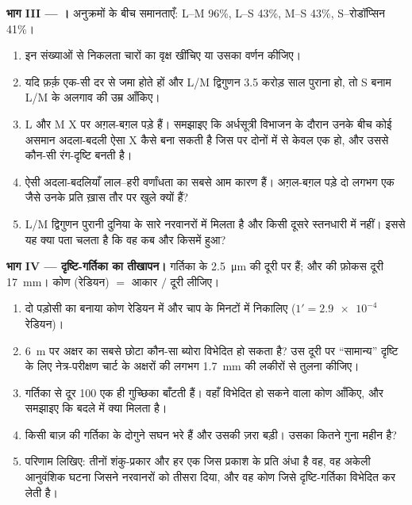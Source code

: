 \begin{problem}
\medskip
\noindent\textbf{भाग III --- ।}
  अनुक्रमों के बीच समानताएँ: L--M 96\%, L--S 43\%, M--S
43\%, S--रोडॉप्सिन 41\%।
\begin{enumerate}[resume]
  \item इन संख्याओं से निकलता चारों  का वृक्ष खींचिए या उसका वर्णन
        कीजिए।
  \item यदि फ़र्क़ एक-सी दर से जमा होते हों और L/M द्विगुणन 3.5 करोड़ साल
        पुराना हो, तो S बनाम L/M के अलगाव की उम्र आँकिए।
  \item L और M  X पर अग़ल-बग़ल पड़े हैं। समझाइए कि अर्धसूत्री विभाजन के
        दौरान उनके बीच कोई असमान अदला-बदली ऐसा X कैसे बना सकती है जिस पर
        दोनों में से केवल एक हो, और उससे कौन-सी रंग-दृष्टि बनती है।
  \item ऐसी अदला-बदलियाँ लाल--हरी वर्णांधता का सबसे आम कारण हैं। अग़ल-बग़ल
        पड़े दो लगभग एक जैसे  उनके प्रति ख़ास तौर पर खुले क्यों हैं?
  \item L/M द्विगुणन पुरानी दुनिया के सारे नरवानरों में मिलता है और किसी
        दूसरे स्तनधारी में नहीं। इससे यह क्या पता चलता है कि वह कब और
        किसमें हुआ?
\end{enumerate}

\medskip
\noindent\textbf{भाग IV --- दृष्टि-गर्तिका का तीखापन।}
गर्तिका के  \qty{2.5}{\micro m} की दूरी पर हैं; और  की फ़ोकस दूरी
\qty{17}{mm}। कोण (रेडियन) $=$ आकार $/$ दूरी लीजिए।
\begin{enumerate}[resume]
  \item दो पड़ोसी  का बनाया कोण रेडियन में और चाप के मिनटों में
        निकालिए ($1' = \num{2.9e-4}$ रेडियन)।
  \item \qty{6}{m} पर अक्षर का सबसे छोटा कौन-सा ब्योरा विभेदित हो सकता है?
        उस दूरी पर ``सामान्य'' दृष्टि के लिए नेत्र-परीक्षण चार्ट के अक्षरों
        की लगभग \qty{1.7}{mm} की लकीरों से तुलना कीजिए।
  \item गर्तिका से दूर 100  एक ही गुच्छिका  बाँटती हैं। वहाँ
        विभेदित हो सकने वाला कोण आँकिए, और समझाइए कि बदले में क्या मिलता
        है।
  \item किसी बाज़ की गर्तिका के  दोगुने सघन भरे हैं और उसकी  ज़रा
        बड़ी। उसका  कितने गुना महीन है?
  \item परिणाम लिखिए: तीनों शंकु-प्रकार और हर एक जिस प्रकाश के प्रति अंधा
        है वह, वह अकेली आनुवंशिक घटना जिसने नरवानरों को तीसरा दिया, और वह
        कोण जिसे दृष्टि-गर्तिका विभेदित कर लेती है।
\end{enumerate}
\end{problem}

